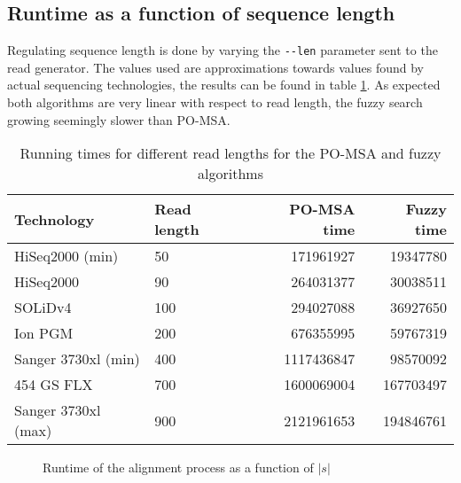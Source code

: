 \documentclass[thesis.tex]{subfiles}
\begin{document}
\subsection*{Runtime as a function of sequence length}
Regulating sequence length is done by varying the \texttt{-{}-len} parameter sent to the read generator. The values used are approximations towards values found by actual sequencing technologies\cite{comparison_sequencing_systems}, the results can be found in table \ref{tab:runtimes_s}. As expected both algorithms are very linear with respect to read length, the fuzzy search growing seemingly slower than PO-MSA.
\begin{table}
  \begin{tabular}{|l|l|r|r|}
    \hline \textbf{Technology} & \textbf{Read length} & \textbf{PO-MSA time} & \textbf{Fuzzy time} \\ \hline
    HiSeq2000 (min) & 50 & 171961927 & 19347780 \\ \hline
    HiSeq2000 & 90 & 264031377 & 30038511 \\ \hline
    SOLiDv4 & 100 & 294027088 & 36927650 \\ \hline
    Ion PGM & 200 & 676355995 & 59767319 \\ \hline
    Sanger 3730xl (min) & 400 & 1117436847 & 98570092 \\ \hline
    454 GS FLX & 700 & 1600069004 & 167703497 \\ \hline
    Sanger 3730xl (max) & 900 & 2121961653 & 194846761 \\ \hline
  \end{tabular}
  \caption{Running times for different read lengths for the PO-MSA and fuzzy algorithms}
  \label{tab:runtimes_s}
\end{table}
\begin{figure}
  \caption{Runtime of the alignment process as a function of $|s|$}
  \label{fig:runtime_s}
\end{figure}
\end{document}
